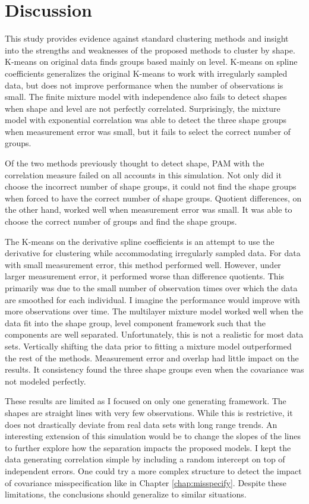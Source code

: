 \section{Discussion}
This study provides evidence against standard clustering methods and insight into the strengths and weaknesses of the proposed methods to cluster by shape. K-means on original data finds groups based mainly on level. K-means on spline coefficients generalizes the original K-means to work with irregularly sampled data, but does not improve performance when the number of observations is small. The finite mixture model with independence also fails to detect shapes when shape and level are not perfectly correlated. Surprisingly, the mixture model with exponential correlation was able to detect the three shape groups when measurement error was small, but it fails to select the correct number of groups.

Of the two methods previously thought to detect shape, PAM with the correlation measure failed on all accounts in this simulation. Not only did it choose the incorrect number of shape groups, it could not find the shape groups when forced to have the correct number of shape groups. Quotient differences, on the other hand, worked well when measurement error was small. It was able to choose the correct number of groups and find the shape groups.

The K-means on the derivative spline coefficients is an attempt to use the derivative for clustering while accommodating irregularly sampled data. For data with small measurement error, this method performed well. However, under larger measurement error, it performed worse than difference quotients. This primarily was due to the small number of observation times over which the data are smoothed for each individual. I imagine the performance would improve with more observations over time.  The multilayer mixture model worked well when the data fit into the shape group, level component framework such that the components are well separated. Unfortunately, this is not a realistic for most data sets. Vertically shifting the data prior to fitting a mixture model outperformed the rest of the methods. Measurement error and overlap had little impact on the results. It consistency found the three shape groups even when the covariance was not modeled perfectly.

These results are limited as I focused on only one generating framework. The shapes are straight lines with very few observations. While this is restrictive, it does not drastically deviate from real data sets with long range trends. An interesting extension of this simulation would be to change the slopes of the lines to further explore how the separation impacts the proposed models. I kept the data generating correlation simple by including a random intercept on top of independent errors. One could try a more complex structure to detect the impact of covariance misspecification like in Chapter \ref{chap:misspecify}. Despite these limitations, the conclusions should generalize to similar situations. 


